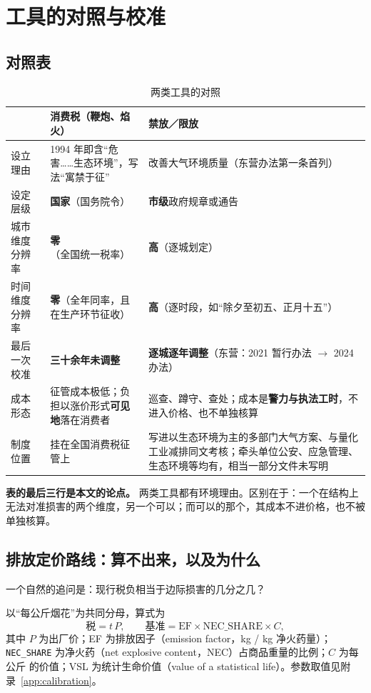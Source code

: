 \section{工具的对照与校准}\label{sec:comparison}

\subsection{对照表}

\begin{table}[H]
\centering
\caption{两类工具的对照}
\label{tab:contrast}
\small
\begin{tabular}{L{3.2cm}L{5.5cm}L{5.5cm}}
\toprule
 & \textbf{消费税（鞭炮、焰火）} & \textbf{禁放／限放} \\
\midrule
设立理由 & 1994 年即含“危害……生态环境”，写法“寓禁于征” & 改善大气环境质量（东营办法第一条首列） \\
设定层级 & \textbf{国家}（国务院令） & \textbf{市级}政府规章或通告 \\
城市维度分辨率 & \textbf{零}（全国统一税率） & \textbf{高}（逐城划定） \\
时间维度分辨率 & \textbf{零}（全年同率，且在生产环节征收） & \textbf{高}（逐时段，如“除夕至初五、正月十五”） \\
最后一次校准 & \textbf{三十余年未调整} & \textbf{逐城逐年调整}（东营：2021 暂行办法 $\rightarrow$ 2024 办法） \\
成本形态 & 征管成本极低；负担以涨价形式\textbf{可见地}落在消费者 & 巡查、蹲守、查处；成本是\textbf{警力与执法工时}，不进入价格、也不单独核算 \\
制度位置 & 挂在全国消费税征管上 & 写进以生态环境为主的多部门大气方案、与量化工业减排同文考核；牵头单位公安、应急管理、生态环境等均有，相当一部分文件未写明 \\
\bottomrule
\end{tabular}
\end{table}

\textbf{表的最后三行是本文的论点。} 两类工具都有环境理由。区别在于：一个在结构上无法对准损害的两个维度，另一个可以；而可以的那个，其成本不进价格，也不被单独核算。

\subsection{排放定价路线：算不出来，以及为什么}\label{sec:pigou}

一个自然的追问是：现行税负相当于边际损害的几分之几？

以“每公斤烟花”为共同分母，算式为
\begin{equation}
\text{税} = t\,P, \qquad \text{基准} = \mathrm{EF}\times \mathrm{NEC\_SHARE}\times C,
\label{eq:calib}
\end{equation}
其中 $P$ 为出厂价；EF 为排放因子（emission factor，kg  / kg 净火药量）；\texttt{NEC\_SHARE} 为净火药（net explosive content，NEC）占商品重量的比例；$C$ 为每公斤  的价值；VSL 为统计生命价值（value of a statistical life）。参数取值见附录~\ref{app:calibration}。

